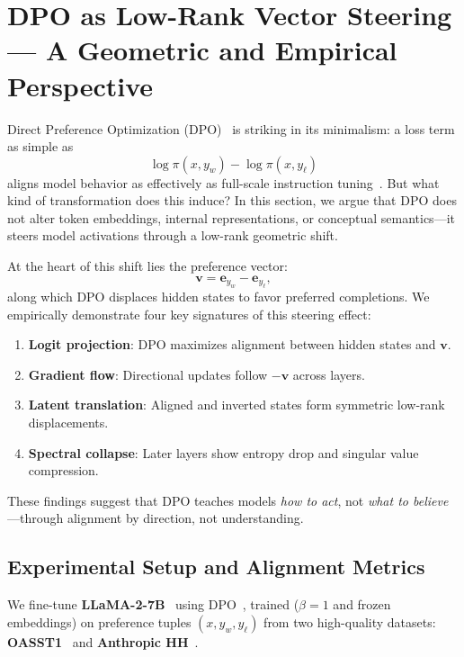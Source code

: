 





\section{DPO as Low-Rank Vector Steering — A Geometric and Empirical Perspective}

Direct Preference Optimization (DPO)~\citep{rafailov2023direct, liu2023aligning} is striking in its minimalism: a loss term as simple as
\[
\log \pi(x, y_w) - \log \pi(x, y_\ell)
\]
aligns model behavior as effectively as full-scale instruction tuning~\citep{zhou2023lima, touvron2023llama}. But what kind of transformation does this induce? In this section, we argue that DPO does not alter token embeddings, internal representations, or conceptual semantics—it steers model activations through a low-rank geometric shift.

At the heart of this shift lies the preference vector:
\[
\mathbf{v} = \mathbf{e}_{y_w} - \mathbf{e}_{y_\ell},
\]
along which DPO displaces hidden states to favor preferred completions. We empirically demonstrate four key signatures of this steering effect:
\begin{enumerate}
    \item \textbf{Logit projection}: DPO maximizes alignment between hidden states and \( \mathbf{v} \).
    \item \textbf{Gradient flow}: Directional updates follow \( -\mathbf{v} \) across layers.
    \item \textbf{Latent translation}: Aligned and inverted states form symmetric low-rank displacements.
    \item \textbf{Spectral collapse}: Later layers show entropy drop and singular value compression.
\end{enumerate}

These findings suggest that DPO teaches models \emph{how to act}, not \emph{what to believe}—through alignment by direction, not understanding.


\subsection{Experimental Setup and Alignment Metrics}
\label{sec:experimental-metrics}

We fine-tune \textbf{LLaMA-2-7B}~\citep{touvron2023llama} using DPO~\citep{rafailov2023direct}, trained (\( \beta = 1 \) and frozen embeddings) on preference tuples \( (x, y_w, y_\ell) \) from two high-quality datasets: \textbf{OASST1}~\citep{kopf2023openassistant} and \textbf{Anthropic HH}~\citep{askell2021general}. 

